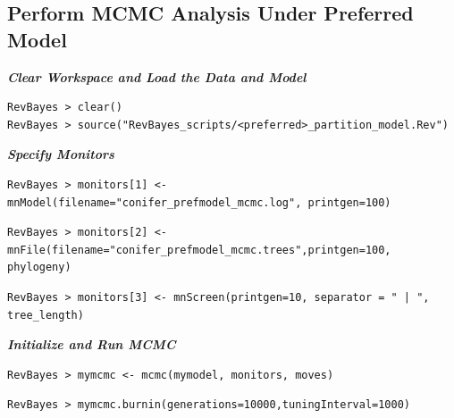 \documentclass[11pt]{article}
\begin{document}
\bigskip
\subsection{Perform MCMC Analysis Under Preferred Model}

\textbf{\textit{Clear Workspace and Load the Data and Model}}


{\tt \begin{snugshade*}
\begin{lstlisting}
RevBayes > clear()
RevBayes > source("RevBayes_scripts/<preferred>_partition_model.Rev")
\end{lstlisting}
\end{snugshade*}}

\textbf{\textit{Specify Monitors}}

{\tt \begin{snugshade*}
\begin{lstlisting}
RevBayes > monitors[1] <- mnModel(filename="conifer_prefmodel_mcmc.log", printgen=100)
\end{lstlisting}
\end{snugshade*}}


{\tt \begin{snugshade*}
\begin{lstlisting}
RevBayes > monitors[2] <- mnFile(filename="conifer_prefmodel_mcmc.trees",printgen=100, phylogeny)
\end{lstlisting}
\end{snugshade*}}


{\tt \begin{snugshade*}
\begin{lstlisting}
RevBayes > monitors[3] <- mnScreen(printgen=10, separator = " | ", tree_length)
\end{lstlisting}
\end{snugshade*}}

\textbf{\textit{Initialize and Run MCMC}}

{\tt \begin{snugshade*}
\begin{lstlisting}
RevBayes > mymcmc <- mcmc(mymodel, monitors, moves)
\end{lstlisting}
\end{snugshade*}}


{\tt \begin{snugshade*}
\begin{lstlisting}
RevBayes > mymcmc.burnin(generations=10000,tuningInterval=1000)
\end{lstlisting}
\end{snugshade*}}
\end{document}
